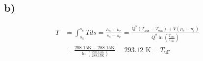 

\subsection*{b)}
\begin{align*}
T &= \int_{s_a}^{s_e} T ds = \frac{h_a - h_e}{s_a - s_e} = \frac{\dot{Q}^o (T_{\text{aus}} - T_{\text{ein}}) + \dot{V} (p_2 - p_1)}{\dot{Q}^o \ln \left( \frac{T_{\text{aus}}}{T_{\text{ein}}} \right)} \\
&= \frac{298.15 \text{K} - 288.15 \text{K}}{\ln \left( \frac{298.15 \text{K}}{288.15 \text{K}} \right)} = 293.12 \text{ K} = T_{\text{uF}}
\end{align*}